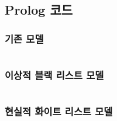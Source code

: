 \documentclass[11pt,a4paper]{article}
\begin{document}
\subsection{Prolog 코드}
\subsubsection{기존 모델}
\inputminted[fontsize=\footnotesize]{prolog}{prev_model.pl}
\subsubsection{이상적 블랙 리스트 모델}
\inputminted[fontsize=\footnotesize]{prolog}{black_model.pl}
\subsubsection{현실적 화이트 리스트 모델}
\inputminted[fontsize=\footnotesize]{prolog}{white_model.pl}
\end{document}
